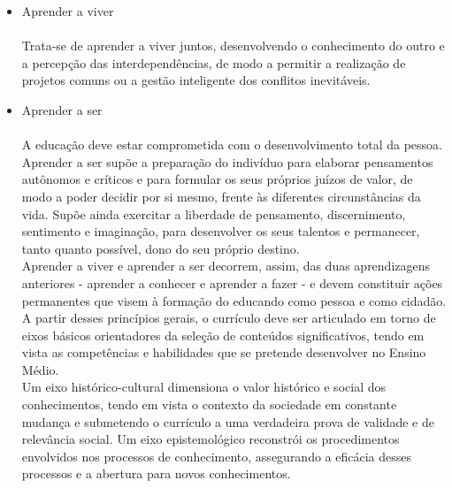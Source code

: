\documentclass[a4paper, 12pt]{article}
\begin{document}
\begin{enumerate}
\begin{itemize}
  \item Aprender a viver\\\\
    Trata-se de aprender a viver juntos, desenvolvendo o conhecimento do outro e a percepção das interdependências, de modo a permitir a realização de projetos comuns ou a gestão inteligente dos conflitos inevitáveis.  
  \item Aprender a ser\\\\
    A educação deve estar comprometida com o desenvolvimento total da pessoa. Aprender a ser supõe a preparação do indivíduo para elaborar pensamentos autônomos e críticos e para formular os seus próprios juízos de valor, de modo a poder decidir por si mesmo, frente às diferentes circunstâncias da vida. Supõe ainda exercitar a liberdade de pensamento, discernimento, sentimento e imaginação, para desenvolver os seus talentos e permanecer, tanto quanto possível, dono do seu próprio destino.\\
    Aprender a viver e aprender a ser decorrem, assim, das duas aprendizagens anteriores - aprender a conhecer e aprender a fazer - e devem constituir ações permanentes que visem à formação do educando como pessoa e como cidadão.\\
    A partir desses princípios gerais, o currículo deve ser articulado em torno de eixos básicos orientadores da seleção de conteúdos significativos, tendo em vista as competências e habilidades que se pretende desenvolver no Ensino Médio. \\
    Um eixo histórico-cultural dimensiona o valor histórico e social dos conhecimentos, tendo em vista o contexto da sociedade em constante mudança e submetendo o currículo a uma verdadeira prova de validade e de relevância social. Um eixo epistemológico reconstrói os procedimentos envolvidos nos processos de conhecimento, assegurando a eficácia desses processos e a abertura para novos conhecimentos.
  \end{itemize}
\end{enumerate}
\end{document}
